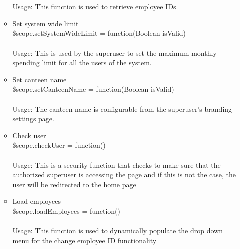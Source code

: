 \documentclass[a4paper,12pt]{report}
\begin{document}
\begin{enumerate}
\begin{itemize}
		\\ \\ Usage: This function is used to retrieve employee IDs 
		\item Set system wide limit \\ \$scope.setSystemWideLimit = function(Boolean isValid)\\ \\ Usage: This is used by the superuser to set the maximum monthly spending limit for all the users of the system.
		 \item Set canteen name \\ \$scope.setCanteenName = function(Boolean isValid) 
		\\ \\ Usage: The canteen name is configurable from the superuser's branding settings page.
		\item Check user \\ \$scope.checkUser = function() 
		\\ \\Usage: This is a security function that checks to make sure that the authorized superuser is accessing the page and if this is not the case, the user will be redirected to the home page
		\item Load employees \\ \$scope.loadEmployees = function() 
		\\ \\Usage: This function is used to dynamically populate the drop down menu for the change employee ID functionality
	\end{itemize}
\end{enumerate} 
\end{document}
